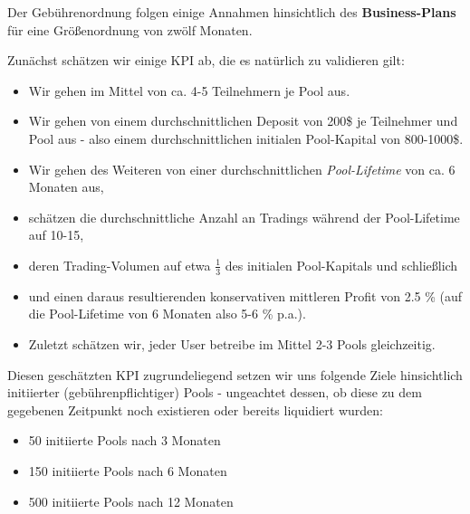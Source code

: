 \vspace{0.5cm}

Der Gebührenordnung folgen einige Annahmen hinsichtlich des \textbf{Business-Plans} für eine Größenordnung von zwölf Monaten.

\vspace{0.3cm}

\begin{Assumption}\label{bp}

Zunächst schätzen wir einige KPI ab, die es natürlich zu validieren gilt:

\begin{itemize}
	\item Wir gehen im Mittel von ca. 4-5 Teilnehmern je Pool aus.
	\item Wir gehen von einem durchschnittlichen Deposit von 200\$ je Teilnehmer und Pool aus - also einem durchschnittlichen initialen Pool-Kapital von 800-1000\$.
	\item Wir gehen des Weiteren von einer durchschnittlichen \textit{Pool-Lifetime} von ca. 6 Monaten aus,
	\item schätzen die durchschnittliche Anzahl an Tradings während der Pool-Lifetime auf 10-15,
	\item deren Trading-Volumen auf etwa $\frac{1}{3}$ des initialen Pool-Kapitals und schließlich 
	\item und einen daraus resultierenden konservativen mittleren Profit von 2.5 \% (auf die Pool-Lifetime von 6 Monaten also 5-6 \% p.a.).
	\item Zuletzt schätzen wir, jeder User betreibe im Mittel 2-3 Pools gleichzeitig.
\end{itemize}

\vspace{0.5cm}

Diesen geschätzten KPI zugrundeliegend setzen wir uns folgende Ziele hinsichtlich initiierter (gebührenpflichtiger) Pools - ungeachtet dessen, ob diese zu dem gegebenen Zeitpunkt noch existieren oder bereits liquidiert wurden:

\begin{itemize}
	\item 50 initiierte Pools nach 3 Monaten
	\item 150 initiierte Pools nach 6 Monaten
	\item 500 initiierte Pools nach 12 Monaten
\end{itemize}

\end{Assumption}

